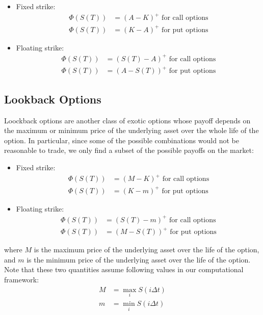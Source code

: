 \begin{itemize}
    \item Fixed strike: \begin{align*}
        \Phi(S(T)) & = (A - K)^+ \text{ for call options} \\
        \Phi(S(T)) & = (K - A)^+ \text{ for put options}
    \end{align*}
    \item Floating strike: \begin{align*}
    \Phi(S(T)) & = (S(T)-A)^+ \text{ for call options} \\
    \Phi(S(T)) & = (A-S(T))^+ \text{ for put options}
\end{align*}
\end{itemize}

\subsection*{Lookback Options}
Loockback options are another class of exotic options whose payoff depends on
the maximum or minimum price of the underlying asset over the whole life of
the option. In particular, since some of the possible combinations would not be
reasonable to trade, we only find a subset of the possible payoffs on the
market:

\begin{itemize}
    \item Fixed strike: \begin{align*}
        \Phi(S(T)) & = (M - K)^+ \text{ for call options} \\
        \Phi(S(T)) & = (K - m)^+ \text{ for put options}
    \end{align*}
    \item Floating strike: \begin{align*}
        \Phi(S(T)) & = (S(T)-m)^+ \text{ for call options} \\
        \Phi(S(T)) & = (M-S(T))^+ \text{ for put options}
    \end{align*}
\end{itemize}

where $M$ is the maximum price of the underlying asset over the life of the
option, and $m$ is the minimum price of the underlying asset over the life of
the option. Note that these two quantities assume following values in our
computational framework:
\begin{align*}
    M & = \max_i S(i\Delta t) \\
    m & = \min_i S(i\Delta t)
\end{align*}

